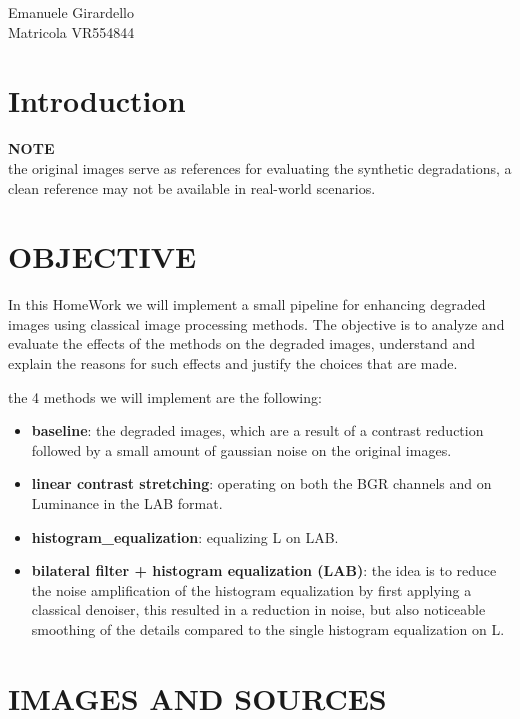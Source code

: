 \documentclass[11pt,a4paper]{article}
\begin{document}
\begin{center}
  {\large Emanuele Girardello}\\[2pt]
  Matricola VR554844
\end{center}

\section{Introduction}

\textbf{NOTE}\\
the original images serve as references
for evaluating the synthetic degradations, a clean reference may not be available in
real-world scenarios.

\section{OBJECTIVE}
In this HomeWork we will implement a small pipeline for enhancing degraded images using classical image processing methods.
The objective is to analyze and evaluate the effects of the methods on the degraded images, understand and explain the reasons for such effects and justify the choices that are made.

the 4 methods we will implement are the following:

\begin{itemize}
  \item \textbf{baseline}: the degraded images, which are a result of a contrast reduction followed by a small amount of gaussian noise on the original images.
  \item \textbf{linear contrast stretching}: operating on both the BGR channels and on Luminance in the LAB format.
  \item \textbf{histogram\_equalization}: equalizing L on LAB.
  \item \textbf{bilateral filter + histogram equalization (LAB)}: the idea is to reduce the noise amplification of the histogram equalization by first applying a classical denoiser, this resulted in a reduction in noise, but also noticeable smoothing of the details compared to the single histogram equalization on L.
\end{itemize}

\section{IMAGES AND SOURCES}
\end{document}
